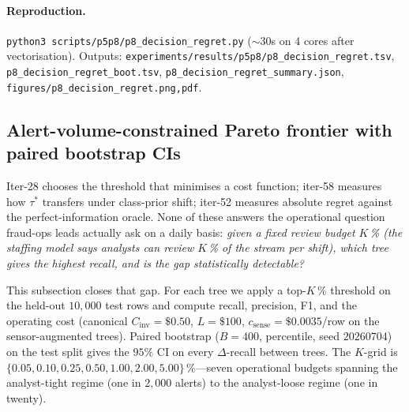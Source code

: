 \documentclass{article}
\begin{document}
\paragraph{Reproduction.}
\texttt{python3 scripts/p5p8/p8\_decision\_regret.py} ($\sim$30s on 4 cores
after vectorisation). Outputs:
\texttt{experiments/results/p5p8/p8\_decision\_regret.tsv},
\texttt{p8\_decision\_regret\_boot.tsv},
\texttt{p8\_decision\_regret\_summary.json},
\texttt{figures/p8\_decision\_regret.{png,pdf}}.

\subsection{Alert-volume-constrained Pareto frontier with paired bootstrap CIs}
\label{sec:p8-alert-volume}

Iter-28 chooses the threshold that minimises a cost function; iter-58
measures how $\tau^{*}$ transfers under class-prior shift; iter-52 measures
absolute regret against the perfect-information oracle. None of these
answers the operational question fraud-ops leads actually ask on a daily
basis: \emph{given a fixed review budget $K$\,\% (the staffing model says
analysts can review $K$\,\% of the stream per shift), which tree gives
the highest recall, and is the gap statistically detectable?}

This subsection closes that gap. For each tree we apply a top-$K$\,\%
threshold on the held-out $10{,}000$ test rows and compute recall,
precision, F1, and the operating cost (canonical
$C_{\text{inv}}{=}\$0.50$, $L{=}\$100$, $c_{\text{sense}}{=}\$0.0035$/row
on the sensor-augmented trees). Paired bootstrap ($B{=}400$, percentile,
seed $20260704$) on the test split gives the $95\%$ CI on every
$\Delta$-recall between trees. The $K$-grid is
$\{0.05, 0.10, 0.25, 0.50, 1.00, 2.00, 5.00\}\,\%$---seven operational
budgets spanning the analyst-tight regime (one in $2{,}000$ alerts) to the
analyst-loose regime (one in twenty).
\end{document}

